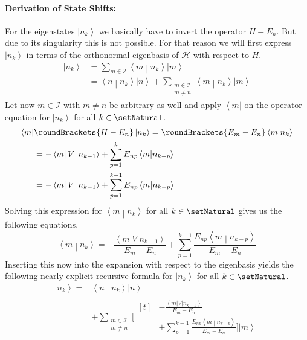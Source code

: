 \documentclass[10pt,fleqn]{article}
\newcommand{\bra}[1]{\left\langle #1 \right\vert}
\newcommand{\ket}[1]{\left\vert #1 \right\rangle}
\newcommand{\bracket}[2]{\left\langle #1 \middle\vert #2 \right\rangle}
\begin{document}
\begin{multicols}{2}
      \paragraph{Derivation of State Shifts:}
      For the eigenstates $\ket{n_k}$ we basically have to invert the operator $H-E_n$.
      But due to its singularity this is not possible.
      For that reason we will first express $\ket{n_k}$ in terms of the orthonormal eigenbasis of $\mathscr{H}$ with respect to $H$.
      \[
        \begin{aligned}
          \ket{n_k}
          &= \sum_{m\in\mathscr{I}} \bracket{m}{n_k} \ket{m} \\
          &= \bracket{n}{n_k}\ket{n} + \sum_{\substack{m\in\mathscr{I}\\m\neq n}} \bracket{m}{n_k} \ket{m}
        \end{aligned}
      \]
      Let now $m\in\mathscr{I}$ with $m\neq n$ be arbitrary as well and apply $\bra{m}$ on the operator equation for $\ket{n_k}$ for all $k\in\setNatural$.
      \[
        \begin{aligned}
          \bra{m}&\roundBrackets{H-E_n}\ket{n_k}
          = \roundBrackets{E_m-E_n}\bracket{m}{n_k} \\
          &= -\bra{m}V\ket{n_{k-1}} + \sum_{p=1}^k E_{np}\bracket{m}{n_{k-p}} \\
          &= -\bra{m}V\ket{n_{k-1}} + \sum_{p=1}^{k-1} E_{np}\bracket{m}{n_{k-p}}
        \end{aligned}
      \]
      Solving this expression for $\bracket{m}{n_k}$ for all $k\in\setNatural$ gives us the following equations.
      \[
        \bracket{m}{n_k} = -\frac{\bra{m}V\ket{n_{k-1}}}{E_m-E_n} + \sum_{p=1}^{k-1} \frac{E_{np}\bracket{m}{n_{k-p}}}{E_m - E_n}
      \]
      Inserting this now into the expansion with respect to the eigenbasis yields the following nearly explicit recursive formula for $\ket{n_k}$ for all $k\in\setNatural$.
      \[
          \begin{aligned}
            \ket{n_k} =
            &\bracket{n}{n_k}\ket{n} \\
            &+ \sum_{\substack{m\in\mathscr{I}\\m\neq n}} \bigg[
              \begin{aligned}[t]
                &-\frac{\bra{m}V\ket{n_{k-1}}}{E_m-E_n} \\
                &+ \sum_{p=1}^{k-1} \frac{E_{np}\bracket{m}{n_{k-p}}}{E_m - E_n} \bigg] \ket{m}
              \end{aligned}

\end{aligned}\]
\end{multicols}
\end{document}

